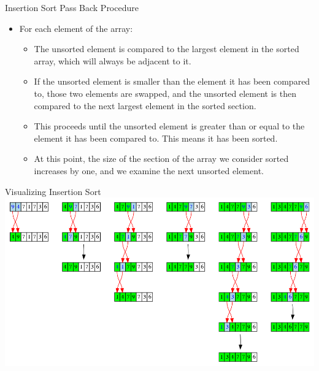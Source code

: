 \documentclass[11pt]{beamer}
\begin{document}
\begin{frame}{Insertion Sort Pass Back Procedure}
\begin{itemize}
\item For each element of the array:
\begin{itemize} 
\item The unsorted element is compared to the largest element in the sorted array, which will always be adjacent to it.  
\item If the unsorted element is smaller than the element it has been compared to, those two elements are swapped, and the unsorted element is then compared to the next largest element in the sorted section.
\item This proceeds until the unsorted element is greater than or equal to the element it has been compared to.  This means it has been sorted.  
\item At this point, the size of the section of the array we consider sorted increases by one, and we examine the next unsorted element.  
\end{itemize}
\end{itemize}
\end{frame}

\begin{frame}{Visualizing Insertion Sort}
\center
\includegraphics[scale=0.25]{graphs/insertionsort.png}
\end{frame}
\end{document}
